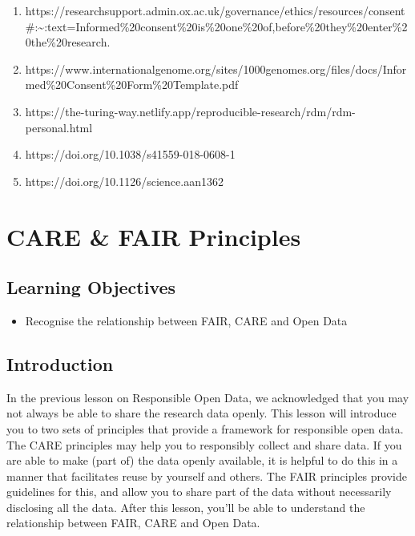 \documentclass[
  letterpaper,
  DIV=11,
  numbers=noendperiod]{scrreport}
\providecommand{\tightlist}{%
  \setlength{\itemsep}{0pt}\setlength{\parskip}{0pt}}\usepackage{longtable,booktabs,array}
\begin{document}
\begin{enumerate}
\def\labelenumi{\arabic{enumi}.}
\tightlist
\item
  https://researchsupport.admin.ox.ac.uk/governance/ethics/resources/consent\#:\textasciitilde:text=Informed\%20consent\%20is\%20one\%20of,before\%20they\%20enter\%20the\%20research.
\item
  https://www.internationalgenome.org/sites/1000genomes.org/files/docs/Informed\%20Consent\%20Form\%20Template.pdf
\item
  https://the-turing-way.netlify.app/reproducible-research/rdm/rdm-personal.html
\item
  https://doi.org/10.1038/s41559-018-0608-1
\item
  https://doi.org/10.1126/science.aan1362
\end{enumerate}

\hypertarget{care-fair-principles}{%
\chapter{CARE \& FAIR Principles}\label{care-fair-principles}}

\hypertarget{learning-objectives-2}{%
\section{Learning Objectives}\label{learning-objectives-2}}

\begin{itemize}
\tightlist
\item
  Recognise the relationship between FAIR, CARE and Open Data
\end{itemize}

\hypertarget{introduction-13}{%
\section{Introduction}\label{introduction-13}}

In the previous lesson on Responsible Open Data, we acknowledged that
you may not always be able to share the research data openly. This
lesson will introduce you to two sets of principles that provide a
framework for responsible open data. The CARE principles may help you to
responsibly collect and share data. If you are able to make (part of)
the data openly available, it is helpful to do this in a manner that
facilitates reuse by yourself and others. The FAIR principles provide
guidelines for this, and allow you to share part of the data without
necessarily disclosing all the data. After this lesson, you'll be able
to understand the relationship between FAIR, CARE and Open Data.
\end{document}
